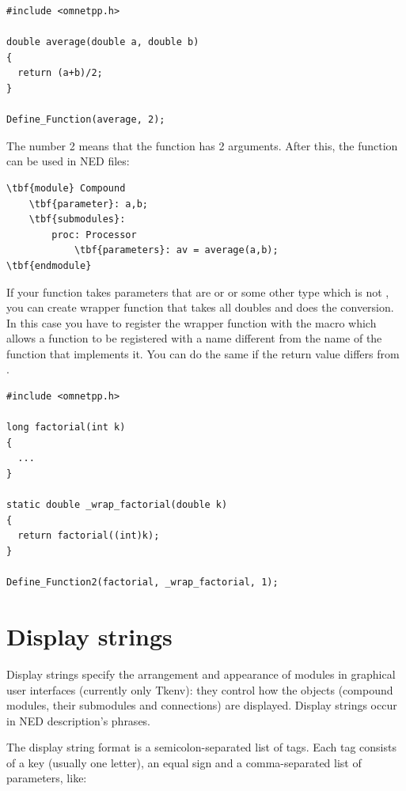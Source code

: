 \begin{verbatim}
#include <omnetpp.h>

double average(double a, double b)
{
  return (a+b)/2;
}

Define_Function(average, 2);
\end{verbatim}


The number 2 means that the  function has 2
arguments.  After this, the  function can be used in
NED files:


\begin{Verbatim}[commandchars=\\\{\}]
\tbf{module} Compound
    \tbf{parameter}: a,b;
    \tbf{submodules}:
        proc: Processor
            \tbf{parameters}: av = average(a,b);
\tbf{endmodule}
\end{Verbatim}


If your function takes parameters that are  or  or
some other type which is not , you can create wrapper function
that takes all doubles and does the conversion. In this case you have
to register the wrapper function with the  macro
which allows a function to be registered with a name different from the
name of the function that implements it. You can do the same
if the return value differs from .

\begin{verbatim}
#include <omnetpp.h>

long factorial(int k)
{
  ...
}

static double _wrap_factorial(double k)
{
  return factorial((int)k);
}

Define_Function2(factorial, _wrap_factorial, 1);
\end{verbatim}


\section{Display strings}
\label{sec:ch-ned-lang:display-strings}

Display strings specify the arrangement and
appearance of modules in graphical user interfaces (currently only
Tkenv): they control how the objects (compound modules, their
submodules and connections) are displayed. Display strings occur in
NED description's 
phrases.

The display string format is a semicolon-separated list of tags.
Each tag consists of a key (usually one letter), an equal sign
and a comma-separated list of parameters, like:

